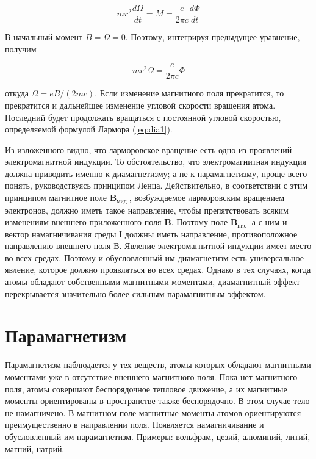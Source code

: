 \documentclass[12pt]{article}
\begin{document}
  \begin{equation}
  m r^2 \frac{d \Omega}{d t}=M=\frac{e}{2 \pi c} \frac{d \Phi}{d t}
  \end{equation}

  В начальный момент $B=\Omega=0$. Поэтому, интегрируя предыдущее уравнение, получим

  \begin{equation}
  m r^2 \Omega=\frac{e}{2 \pi c} \Phi
  \end{equation}

  откуда $\Omega=e B /(2 m c)$. Если изменение магнитного поля прекратится, то прекратится и дальнейшее изменение угловой скорости вращения атома. Последний будет продолжать вращаться с постоянной угловой скоростью, определяемой формулой Лармора (\ref{eq:dia1}).

  Из изложенного видно, что ларморовское вращение есть одно из проявлений электромагнитной индукции. То обстоятельство, что электромагнитная индукция должна приводить именно к диамагнетизму; а не к парамагнетизму, проще всего понять, руководствуясь принципом Ленца. Действительно, в соответствии с этим принципом магнитное поле $\mathbf{B}_{\text {мид }}$, возбуждаемое ларморовским вращением электронов, должно иметь такое направление, чтобы препятствовать всяким изменениям внешнего приложенного поля $\mathbf{B}$. Поэтому поле $\mathbf{B}_{\text {нис }}$ а с ним и вектор намагничивания среды I должны иметь направление, противоположное направлению внешнего поля В. Явление электромагнитной индукции имеет место во всех средах. Поэтому и обусловленный им диамагнетизм есть универсальное явление, которое должно проявляться во всех средах. Однако в тех случаях, когда атомы обладают собственными магнитными моментами, диамагнитный эффект перекрывается значительно более сильным парамагнитным эффектом.

  \section{Парамагнетизм}
  Парамагнетизм наблюдается у тех веществ, атомы которых обладают магнитными моментами уже в отсутствие внешнего магнитного поля. Пока нет магнитного поля, атомы совершают беспорядочное тепловое движение, а их магнитные моменты ориентированы в пространстве также беспорядочно. В этом случае тело не намагничено. В магнитном поле магнитные моменты атомов ориентируются преимущественно в направлении поля. Появляется намагничивание и обусловленный им парамагнетизм. Примеры: вольфрам, цезий, алюминий, литий, магний, натрий.
\end{document}

